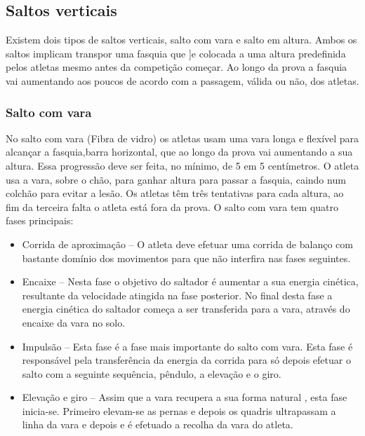 \documentclass{report}
\begin{document}
    
    
    
    
    
    
        \subsection{Saltos verticais}
        Existem dois tipos de saltos verticais, salto com vara e salto em altura. Ambos os saltos implicam transpor uma fasquia que ]e colocada a uma altura predefinida pelos atletas mesmo antes da competição começar. Ao longo da prova a fasquia vai aumentando aos poucos de acordo com a passagem, válida ou não, dos atletas. 
            \subsubsection{Salto com vara}
            No salto com vara (Fibra de vidro) os atletas usam uma vara longa e flexível para alcançar a fasquia,barra horizontal, que ao longo da prova vai aumentando a sua altura. Essa progressão deve ser feita, no mínimo, de 5 em 5 centímetros. O atleta usa a vara, sobre o chão, para ganhar altura para passar a fasquia, caindo num colchão para evitar a lesão. Os atletas têm três tentativas para cada altura, ao fim da terceira falta o atleta está fora da prova. O salto com vara tem quatro fases principais:
            \begin{itemize}
                \item  Corrida de aproximação – O atleta deve efetuar uma corrida de balanço com bastante domínio dos movimentos para que não interfira nas fases seguintes.
                \item Encaixe – Nesta fase o objetivo do saltador é aumentar a sua energia cinética, resultante da velocidade atingida na fase posterior. No final desta fase a energia cinética do saltador começa a ser transferida para a vara, através do encaixe da vara no solo.
                \item Impulsão – Esta fase é a fase mais importante do salto com vara. Esta fase é responsável pela transferência da energia da corrida para só depois efetuar o salto com a seguinte sequência, pêndulo, a elevação e o giro.
                \item Elevação e giro – Assim que a vara recupera a sua forma natural , esta fase inicia-se. Primeiro elevam-se as pernas e depois os quadris ultrapassam a linha da vara e depois e é efetuado a recolha da vara do atleta.
                \cite{saltovara}
            \end{itemize}
           
\end{document}
